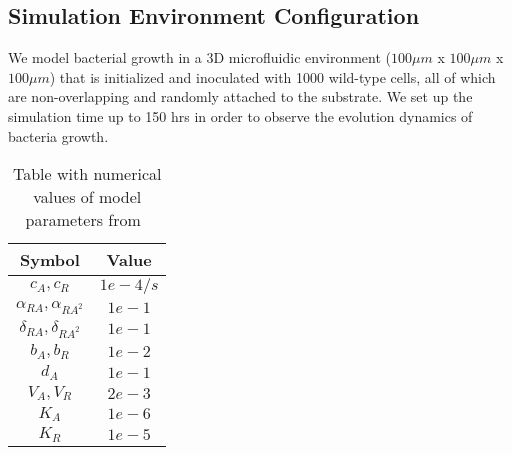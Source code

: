 \documentclass[runningheads]{llncs}
\begin{document}
\subsection*{Simulation Environment Configuration}
We model bacterial growth in a 3D microfluidic environment ($100 \mu m$ x $100 \mu m$ x $100 \mu m$) that is initialized and inoculated with 1000 wild-type cells, all of which are non-overlapping and randomly attached to the substrate. We set up the simulation time up to 150 hrs in order to observe the evolution dynamics of bacteria growth. 



\newpage
\begin{table}[!h]
\centering
\begin{tabular}{|c|c|}
\hline
\bf Symbol  & Value  \\ \hline
  $c_{A}, c_{R}$ & $1e-4/s$   \\ \hline 
  $\alpha_{RA}, \alpha_{RA^2}$ & $1e-1$  \\ \hline
  $\delta_{RA}, \delta_{RA^2}$ & $1e-1$  \\ \hline
  $b_{A}, b_{R}  $ & $1e-2$  \\ \hline
   $d_{A}$ & $1e-1$  \\ \hline
   $V_{A}, V_{R}  $ & $2e-3$ \\ \hline
   $K_{A}$ & $1e-6$ \\ \hline
   $K_{R}$ & $1e-5$  \\ \hline
\end{tabular}
\caption{\label{values} Table with numerical values of model parameters from~\cite{Melke2010}\cite{Fagerlind2005}}
\end{table}
\end{document}
